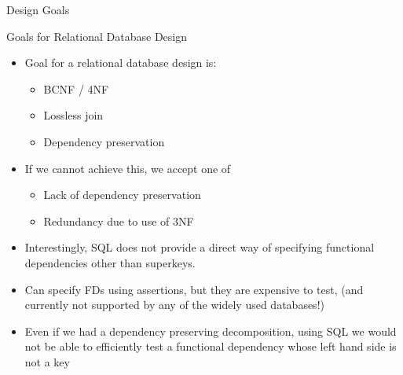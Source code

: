 \documentclass[aspectratio=169, xcolor=dvipsnames]{beamer}
\begin{document}
\begin{frame}{Design Goals}
    \begin{block}{Goals for Relational Database Design}
        \begin{itemize}[<+->]
            \item Goal for a relational database design is:
            \begin{itemize}
                \item[$\triangleright$] BCNF / 4NF
                \item[$\triangleright$] Lossless join
                \item[$\triangleright$] Dependency preservation
            \end{itemize}
            \item If we cannot achieve this, we accept one of
            \begin{itemize}
                \item[$\triangleright$] Lack of dependency preservation
                \item[$\triangleright$] Redundancy due to use of 3NF
            \end{itemize}
        \end{itemize}
    \end{block}
    \begin{itemize}[<+->]
        \item Interestingly, SQL does not provide a direct way of specifying functional dependencies other than superkeys.
        \item Can specify FDs using assertions, but they are expensive to test, (and currently not supported by any of the widely used databases!)
        \item Even if we had a dependency preserving decomposition, using SQL we would not be able to efficiently test a functional dependency whose left hand side is not a key
    \end{itemize}
\end{frame}
\end{document}
